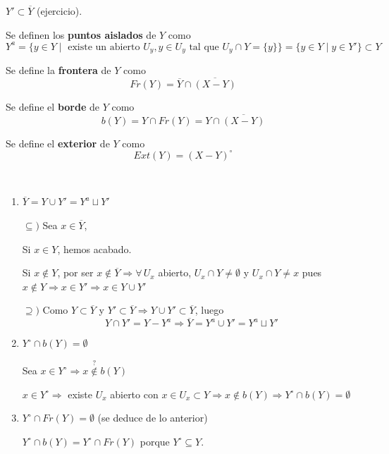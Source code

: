 \begin{obs}
    $Y' \subset \overline{Y}$ (ejercicio).
\end{obs}
\begin{defi}Se definen los \textbf{puntos aislados} de $Y$ como
    $$Y^a = \{y\in Y \mid \text{ existe un abierto } U_y, y\in U_y \text{ tal que } U_y \cap Y = \{y\} \} = \{y \in Y \mid y \in Y'\}\subset Y$$
\end{defi}
\begin{defi}
    Se define la \textbf{frontera} de $Y$ como 
    $$Fr(Y) = \overline{Y} \cap \overline{(X-Y)}$$
\end{defi}
\begin{defi}
    Se define el \textbf{borde} de $Y$ como 
    $$b(Y) = Y \cap Fr(Y) = Y \cap \overline{(X-Y)}$$ 
\end{defi}
\begin{defi}
    Se define el \textbf{exterior} de $Y$ como 
    $$Ext(Y)=(X-Y)^{\circ}$$
\end{defi}
\begin{propis} \,
\begin{enumerate}
    \item $\overline{Y} = Y \cup Y' = Y^a \sqcup Y'$
    \begin{dem}
        $\subseteq) $ Sea $x\in \overline{Y}$, 

        Si $x\in Y$, hemos acabado.

        Si $x\nin Y$, por ser $x\nin \overline{Y} \Rightarrow \forall\, U_x$ abierto, $U_x\cap Y \neq \emptyset$ y $U_x\cap Y \neq x$ pues $x\nin Y \Rightarrow x\in Y' \Rightarrow x\in Y \cup Y'$

        $\supseteq)$ Como $Y \subset \overline{Y}$ y $Y' \subset \overline{Y} \Rightarrow Y \cup Y' \subset \overline{Y}$, luego
        $$Y\cap Y' = Y-Y^a \Rightarrow \overline{Y} = Y^a \cup Y' = Y^a \sqcup Y'$$
    \end{dem}
    \item $Y^{\circ} \cap b(Y) = \emptyset$
    \begin{dem}
        Sea $x\in Y^{\circ} \Rightarrow x \overset{?}{\nin} b(Y)$

        $x\in Y^{\circ} \Rightarrow$ existe $U_x$ abierto con $x\in U_x \subset Y \Rightarrow x\nin b(Y) \Rightarrow Y^{\circ} \cap b(Y) = \emptyset$
    \end{dem}
    \item $Y^{\circ} \cap Fr(Y) = \emptyset$ (se deduce de lo anterior)
    
    $Y^{\circ} \cap b(Y)  = Y^{\circ} \cap Fr(Y)$ porque $Y^{\circ} \subseteq Y$.
\end{enumerate}
\end{propis}



